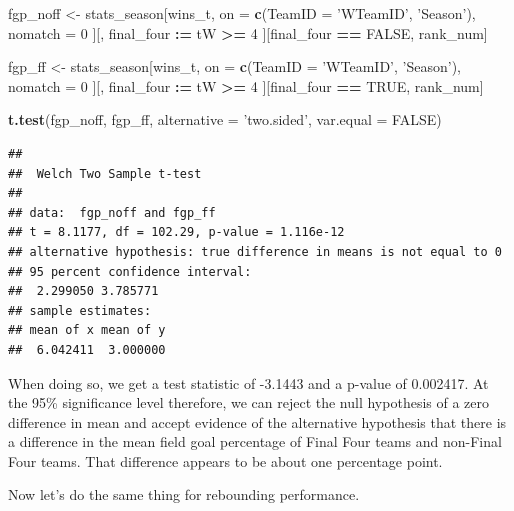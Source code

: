 \documentclass[]{article}
\newenvironment{Shaded}{\begin{snugshade}}{\end{snugshade}}
\newcommand{\KeywordTok}[1]{\textcolor[rgb]{0.13,0.29,0.53}{\textbf{#1}}}
\newcommand{\DataTypeTok}[1]{\textcolor[rgb]{0.13,0.29,0.53}{#1}}
\newcommand{\DecValTok}[1]{\textcolor[rgb]{0.00,0.00,0.81}{#1}}
\newcommand{\StringTok}[1]{\textcolor[rgb]{0.31,0.60,0.02}{#1}}
\newcommand{\OtherTok}[1]{\textcolor[rgb]{0.56,0.35,0.01}{#1}}
\newcommand{\OperatorTok}[1]{\textcolor[rgb]{0.81,0.36,0.00}{\textbf{#1}}}
\newcommand{\ErrorTok}[1]{\textcolor[rgb]{0.64,0.00,0.00}{\textbf{#1}}}
\newcommand{\NormalTok}[1]{#1}
\begin{document}
\begin{Shaded}
\begin{Highlighting}[]
\NormalTok{fgp_noff <-}\StringTok{ }\NormalTok{stats_season[wins_t, on =}\StringTok{ }\KeywordTok{c}\NormalTok{(}\DataTypeTok{TeamID =} \StringTok{'WTeamID'}\NormalTok{, }\StringTok{'Season'}\NormalTok{), nomatch =}\StringTok{ }\DecValTok{0}
\NormalTok{              ][, final_four }\OperatorTok{:}\ErrorTok{=}\StringTok{ }\NormalTok{tW }\OperatorTok{>=}\StringTok{ }\DecValTok{4}
\NormalTok{                ][final_four }\OperatorTok{==}\StringTok{ }\OtherTok{FALSE}\NormalTok{,  rank_num]}

\NormalTok{fgp_ff <-}\StringTok{ }\NormalTok{stats_season[wins_t, on =}\StringTok{ }\KeywordTok{c}\NormalTok{(}\DataTypeTok{TeamID =} \StringTok{'WTeamID'}\NormalTok{, }\StringTok{'Season'}\NormalTok{), nomatch =}\StringTok{ }\DecValTok{0}
\NormalTok{              ][, final_four }\OperatorTok{:}\ErrorTok{=}\StringTok{ }\NormalTok{tW }\OperatorTok{>=}\StringTok{ }\DecValTok{4}
\NormalTok{                ][final_four }\OperatorTok{==}\StringTok{ }\OtherTok{TRUE}\NormalTok{,  rank_num]}

\KeywordTok{t.test}\NormalTok{(fgp_noff, fgp_ff, }\DataTypeTok{alternative =} \StringTok{'two.sided'}\NormalTok{, }\DataTypeTok{var.equal =} \OtherTok{FALSE}\NormalTok{)}
\end{Highlighting}
\end{Shaded}

\begin{verbatim}
## 
##  Welch Two Sample t-test
## 
## data:  fgp_noff and fgp_ff
## t = 8.1177, df = 102.29, p-value = 1.116e-12
## alternative hypothesis: true difference in means is not equal to 0
## 95 percent confidence interval:
##  2.299050 3.785771
## sample estimates:
## mean of x mean of y 
##  6.042411  3.000000
\end{verbatim}

When doing so, we get a test statistic of -3.1443 and a p-value of
0.002417. At the 95\% significance level therefore, we can reject the
null hypothesis of a zero difference in mean and accept evidence of the
alternative hypothesis that there is a difference in the mean field goal
percentage of Final Four teams and non-Final Four teams. That difference
appears to be about one percentage point.

Now let's do the same thing for rebounding performance.
\end{document}
